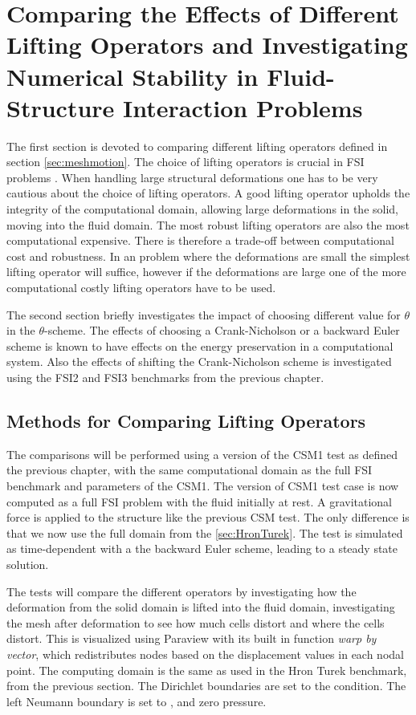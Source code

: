 \chapter{Comparing the Effects of Different Lifting Operators and Investigating Numerical Stability in Fluid-Structure Interaction Problems}\label{sec:mesh_motion}
The first section is devoted to comparing different lifting operators defined in section \ref{sec:meshmotion}. The choice of lifting operators is crucial in FSI problems \cite{Stein2003}. When handling large structural deformations one has to be very cautious about the choice of lifting operators. A good lifting operator upholds the integrity of the computational domain, allowing large deformations in the solid, moving into the fluid domain. The most robust lifting operators are also the most computational expensive. There is therefore a trade-off between computational cost and robustness. In an problem where the deformations are small the simplest lifting operator will suffice, however if the deformations are large one of the more computational costly lifting operators have to be used.

The second section briefly investigates the impact of choosing different value for $\theta$ in the $\theta$-scheme. The effects of choosing a Crank-Nicholson or a backward Euler scheme is known to have effects on the energy preservation in a computational system. Also the effects of shifting the Crank-Nicholson scheme is investigated using the FSI2 and FSI3 benchmarks from the previous chapter.
\section{Methods for Comparing Lifting Operators}
The comparisons will be performed using a version of the CSM1 test as defined the previous chapter, with the same computational domain as the full FSI benchmark and parameters of the CSM1. The version of CSM1 test case is now computed as a full FSI problem with the fluid initially at rest. A gravitational force is applied to the structure like the previous CSM test. The only difference is that we now use the full domain from the \ref{sec:HronTurek}. The test is simulated as time-dependent with a the backward Euler scheme, leading to a steady state solution.

The tests will compare the different operators by investigating how the deformation from the solid domain is lifted into the fluid domain, investigating the mesh after deformation to see how much cells distort and where the cells distort. This is visualized using Paraview with its built in function \textit{warp by vector}, which redistributes nodes based on the displacement values in each nodal point.
The computing domain is the same as used in the Hron Turek benchmark, from the previous section.
The Dirichlet boundaries are set to the  condition. The left Neumann boundary is set to , and zero pressure. \newline

